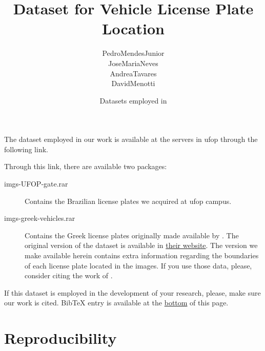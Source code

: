 

% 

\renewcommand\highlightauthorname[1]{#1}

\title{Dataset for Vehicle License Plate Location}
\author{\gls{PedroMendesJunior}\\%
  \gls{JoseMariaNeves}\\%
  \gls{AndreaTavares}\\%
  \gls{DavidMenotti}\\%
}
\date{Datasets employed in }



\maketitle

The dataset employed in our work  is available at the servers in \gls{ufop} through the following link.

\begin{center}
\end{center}

Through this link, there are available two packages:

\begin{description}
\item[imgs-UFOP-gate.rar]
  Contains the Brazilian license plates we acquired at \gls{ufop} campus.
\item[imgs-greek-vehicles.rar]
  Contains the Greek license plates originally made available by .
  The original version of the dataset is available in \href{http://www.medialab.ntua.gr/research/LPRdatabase.html}{their website}.
  The version we make available herein contains extra information regarding the boundaries of each license plate located in the images.
  If you use those data, please, consider citing the work of .
\end{description}

If this dataset is employed in the development of your research, please, make sure our work  is cited.
BibTeX entry is available at the \hyperref[ref:MendesJunior2011]{bottom} of this page.

\section*{Reproducibility}

